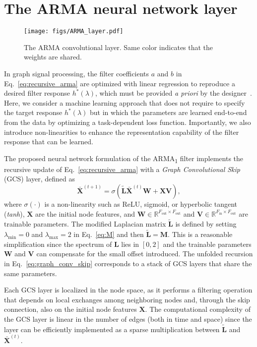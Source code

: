 \documentclass{article}
\def\X{{\mathbf X}}
\def\W{{\mathbf W}}
\def\V{{\mathbf V}}
\def\L{{\mathbf L}}
\def\L{{\mathbf L}}
\begin{document}
\section{The ARMA neural network layer} 
\label{sec:arma}

\begin{figure*}[!ht]
	\centering
	\texttt{[image: figs/ARMA\_layer.pdf]}	
    \caption{The ARMA convolutional layer. Same color indicates that the weights are shared. }
	\label{fig:ARMA_block}
\end{figure*}

In graph signal processing, the filter coefficients $a$ and $b$ in Eq.~\eqref{eq:recursive_arma} are optimized with linear regression to reproduce a desired filter response $h^*(\lambda)$, which must be provided \textit{a priori} by the designer~\cite{isufi2016autoregressive}.
Here, we consider a machine learning approach that does not require to specify the target response $h^*(\lambda)$ but in which the parameters are learned end-to-end from the data by optimizing a task-dependent loss function.
Importantly, we also introduce non-linearities to enhance the representation capability of the filter response that can be learned. 

The proposed neural network formulation of the ARMA\textsubscript{1} filter implements the recursive update of Eq.~\eqref{eq:recursive_arma} with a \textit{Graph Convolutional Skip} (GCS) layer, defined as
\begin{equation}
\label{eq:graph_conv_skip}
    \bar{\X}^{(t+1)}= \sigma\left(\tilde{\L}\bar{\X}^{(t)}\mathbf{W} + \X\V\right),
\end{equation}
where $\sigma(\cdot)$ is a non-linearity such as ReLU, sigmoid, or hyperbolic tangent (\emph{tanh}), $\X$ are the initial node features, and $\W \in \mathbb{R}^{F_\text{out} \times F_\text{out}}$ and $\V \in \mathbb{R}^{F_\text{in} \times F_\text{out}}$ are trainable parameters.
The modified Laplacian matrix $\tilde{\L}$ is defined by setting $\lambda_\text{min}=0$ and $\lambda_\text{max}=2$ in Eq.~\eqref{eq:M} and then $\tilde{\L} = \mathbf{M}$. 
This is a reasonable simplification since the spectrum of $\L$ lies in $[0,2]$ and the trainable parameters $\W$ and $\V$ can compensate for the small offset introduced.
The unfolded recursion in Eq.~\eqref{eq:graph_conv_skip} corresponds to a stack of GCS layers that share the same parameters.

Each GCS layer is localized in the node space, as it performs a filtering operation that depends on local exchanges among neighboring nodes and, through the skip connection, also on the initial node features $\X$.
The computational complexity of the GCS layer is linear in the number of edges (both in time and space) since the layer can be efficiently implemented as a sparse multiplication between $\tilde \L$ and $\bar{\X}^{(t)}$.
\end{document}
